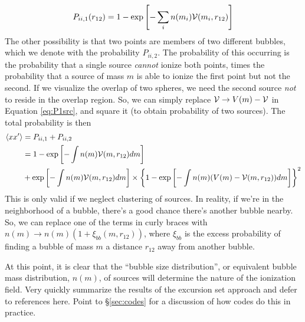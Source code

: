 \begin{equation}
    P_{ii,1} (r_{12}) = 1 - \exp \left[ -\sum_i n(m_i) \mathcal{V}(m_i,r_{12}) \right]
\end{equation}
The other possibility is that two points are members of two different bubbles, which we denote with the probability $P_{ii,2}$. The probability of this occurring is the probability that a single source \textit{cannot} ionize both points, times the probability that a source of mass $m$ is able to ionize the first point but not the second. If we visualize the overlap of two spheres, we need the second source \textit{not} to reside in the overlap region. So, we can simply replace $\mathcal{V} \rightarrow V(m) - \mathcal{V}$ in Equation \ref{eq:P1src}, and square it (to obtain probability of two sources). The total probability is then
\begin{align}
    \langle x x^{\prime} \rangle & = P_{ii,1} + P_{ii,2} \nonumber \\
    & = 1 - \exp \left[- \int n(m) \mathcal{V}(m,r_{12}) dm \right] \nonumber \\
    & + \exp \left[- \int n(m) \mathcal{V}(m,r_{12}) dm \right] \times \left\{1 - \exp \left[- \int n(m) (V(m) - \mathcal{V}(m,r_{12})) dm \right] \right\}^2
\end{align}
This is only valid if we neglect clustering of sources. In reality, if we're in the neighborhood of a bubble, there's a good chance there's another bubble nearby. So, we can replace one of the terms in curly braces with $n(m) \rightarrow n(m) (1 + \xi_{bb}(m, r_{12}))$, where $\xi_{bb}$ is the excess probability of finding a bubble of mass $m$ a distance $r_{12}$ away from another bubble.

At this point, it is clear that the ``bubble size distribution'', or equivalent bubble mass distribution, $n(m)$, of sources will determine the nature of the ionization field. {\color{red} Very quickly summarize the results of the excursion set approach and defer to references here. Point to \S\ref{sec:codes} for a discussion of how codes do this in practice.}

